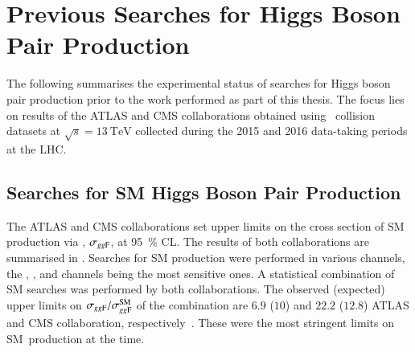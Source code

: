 \section{Previous Searches for Higgs Boson Pair Production}%
\label{seq:experimental_status}

The following summarises the experimental status of searches for Higgs boson
pair production prior to the work performed as part of this thesis. The focus
lies on results of the ATLAS and CMS collaborations obtained using \pp~collision
datasets at $\sqrt{s} = \SI{13}{\TeV}$ collected during the 2015 and 2016
data-taking periods at the LHC.


\subsection*{Searches for SM Higgs Boson Pair Production}%
\label{sec:past_results_smhh}


The ATLAS and CMS collaborations set upper limits on the cross section of SM \HH
production via \ggF, $\sigma_{gg\text{F}}$, at \SI{95}{\percent} CL. The results of
both collaborations are summarised in . Searches for
SM \HH production were performed in various channels, the \bbbb, \bbtautau, and
\bbyy channels being the most sensitive ones. A statistical combination of SM
\HH searches was performed by both collaborations. The observed (expected) upper
limits on $\sigma_{gg\text{F}} / \sigma_{gg\text{F}}^{\text{SM}}$ of the combination are
$6.9$ ($10$) and $22.2$ ($12.8$) ATLAS and CMS collaboration,
respectively~\cite{HDBS-2018-58,CMS-HIG-17-030}. These were the most stringent
limits on SM~\HH production at the time.

